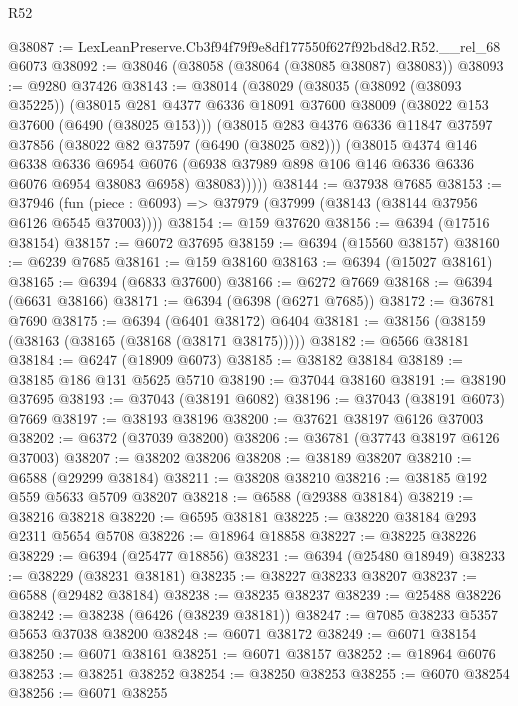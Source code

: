 \begin{lexlean}{R52}
\begin{coremodule}
@38087 := LexLeanPreserve.Cb3f94f79f9e8df177550f627f92bd8d2.R52.__rel_68 @6073
@38092 := @38046 (@38058 (@38064 (@38085 @38087) @38083))
@38093 := @9280 @37426
@38143 := @38014
    (@38029
      (@38035
        (@38092 (@38093 @35225))
        (@38015
          @281
          @4377
          @6336
          @18091
          @37600
          @38009
          (@38022 @153 @37600 (@6490 (@38025 @153)))
          (@38015
            @283
            @4376
            @6336
            @11847
            @37597
            @37856
            (@38022 @82 @37597 (@6490 (@38025 @82)))
            (@38015
              @4374
              @146
              @6338
              @6336
              @6954
              @6076
              (@6938 @37989 @898 @106 @146 @6336 @6336 @6076 @6954 @38083 @6958)
              @38083)))))
@38144 := @37938 @7685
@38153 := @37946
    (fun (piece : @6093) => @37979 (@37999 (@38143 (@38144 @37956 @6126 @6545 @37003))))
@38154 := @159 @37620
@38156 := @6394 (@17516 @38154)
@38157 := @6072 @37695
@38159 := @6394 (@15560 @38157)
@38160 := @6239 @7685
@38161 := @159 @38160
@38163 := @6394 (@15027 @38161)
@38165 := @6394 (@6833 @37600)
@38166 := @6272 @7669
@38168 := @6394 (@6631 @38166)
@38171 := @6394 (@6398 (@6271 @7685))
@38172 := @36781 @7690
@38175 := @6394 (@6401 @38172) @6404
@38181 := @38156 (@38159 (@38163 (@38165 (@38168 (@38171 @38175)))))
@38182 := @6566 @38181
@38184 := @6247 (@18909 @6073)
@38185 := @38182 @38184
@38189 := @38185 @186 @131 @5625 @5710
@38190 := @37044 @38160
@38191 := @38190 @37695
@38193 := @37043 (@38191 @6082)
@38196 := @37043 (@38191 @6073) @7669
@38197 := @38193 @38196
@38200 := @37621 @38197 @6126 @37003
@38202 := @6372 (@37039 @38200)
@38206 := @36781 (@37743 @38197 @6126 @37003)
@38207 := @38202 @38206
@38208 := @38189 @38207
@38210 := @6588 (@29299 @38184)
@38211 := @38208 @38210
@38216 := @38185 @192 @559 @5633 @5709 @38207
@38218 := @6588 (@29388 @38184)
@38219 := @38216 @38218
@38220 := @6595 @38181
@38225 := @38220 @38184 @293 @2311 @5654 @5708
@38226 := @18964 @18858
@38227 := @38225 @38226
@38229 := @6394 (@25477 @18856)
@38231 := @6394 (@25480 @18949)
@38233 := @38229 (@38231 @38181)
@38235 := @38227 @38233 @38207
@38237 := @6588 (@29482 @38184)
@38238 := @38235 @38237
@38239 := @25488 @38226
@38242 := @38238 (@6426 (@38239 @38181))
@38247 := @7085 @38233 @5357 @5653 @37038 @38200
@38248 := @6071 @38172
@38249 := @6071 @38154
@38250 := @6071 @38161
@38251 := @6071 @38157
@38252 := @18964 @6076
@38253 := @38251 @38252
@38254 := @38250 @38253
@38255 := @6070 @38254
@38256 := @6071 @38255

\end{coremodule}
\end{lexlean}
